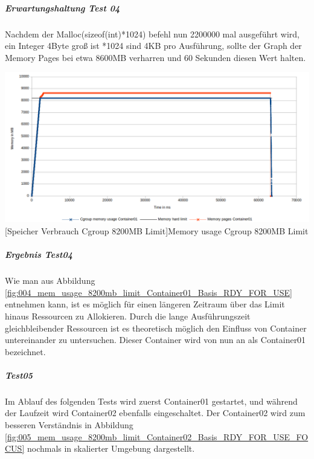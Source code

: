 \subparagraph{Erwartungshaltung Test 04}
Nachdem der Malloc(sizeof(int)*1024) befehl nun 2200000 mal ausgeführt wird, ein Integer 4Byte groß ist *1024 sind 4KB pro Ausführung, sollte der Graph der Memory Pages bei etwa 8600MB verharren und 60 Sekunden diesen Wert halten.

\vspace{1em}
\begin{minipage}{\linewidth}
	\centering
	\includegraphics[width=1\linewidth]{pics/004_mem_usage_8200mb_limit_Container01_Basis_RDY_FOR_USE.png}
	[Speicher Verbrauch Cgroup 8200MB Limit]{Memory usage Cgroup 8200MB Limit}
	\label{fig:004_mem_usage_8200mb_limit_Container01_Basis_RDY_FOR_USE}
\end{minipage}

\subparagraph{Ergebnis Test04}
Wie man aus Abbildung \ref{fig:004_mem_usage_8200mb_limit_Container01_Basis_RDY_FOR_USE} entnehmen kann, ist es möglich für einen längeren Zeitraum über das Limit hinaus Ressourcen zu Allokieren. Durch die lange Ausführungszeit gleichbleibender Ressourcen ist es theoretisch möglich den Einfluss von Container untereinander zu untersuchen. Dieser Container wird von nun an als Container01 bezeichnet.

\subparagraph{Test05}
Im Ablauf des folgenden Tests wird zuerst Container01 gestartet, und während der Laufzeit wird Container02 ebenfalls eingeschaltet. Der Container02 wird zum besseren Verständnis in Abbildung \ref{fig:005_mem_usage_8200mb_limit_Container02_Basis_RDY_FOR_USE_FOCUS} nochmals in skalierter Umgebung dargestellt. 



